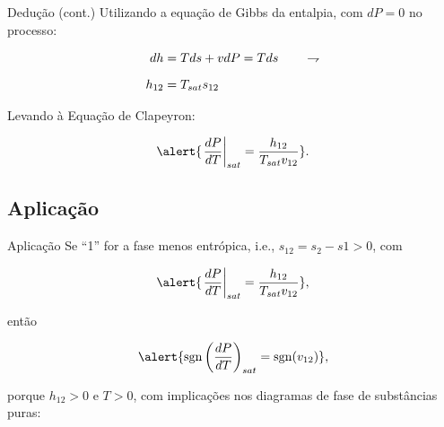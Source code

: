    \begin{frame}{Dedução (cont.)}\vspace*{-1em}
        Utilizando a equação de Gibbs da entalpia, com \alert{$dP=0$} no processo:

        \begin{align*}
            dh &= Tds + vdP = Tds
            \qquad\rightharpoondown\\[\medskipamount]
            h_{12} &= T_{sat}s_{12}
        \end{align*}

        Levando à \alert{Equação de Clapeyron}:

        \begin{equation*}
            \alert{
                \left.\frac{dP}{dT}\right|_{sat} =
                \frac{h_{12}}{T_{sat}v_{12}}
            }.
        \end{equation*}
    \end{frame}

\subsection{Aplicação}

    \begin{frame}{Aplicação}\vspace*{-1em}
        Se ``\alert{1}'' for a fase \alert{menos entrópica}, i.e., \alert{$s_{12} = s_2 - s1 >
        0$}, com

        \begin{equation*}
            \alert{
                \left.\frac{dP}{dT}\right|_{sat} =
                \frac{h_{12}}{T_{sat}v_{12}}
            },
        \end{equation*}

        então

        \begin{equation*}
            \alert{
                \operatorname{sgn}\left(\frac{dP}{dT}\right)_{sat} =
                \operatorname{sgn}(v_{12})
            },
        \end{equation*}\vspace*\medskipamount

        porque \alert{$h_{12} > 0$} e \alert{$T > 0$}, com implicações nos \alert{diagramas de
        fase} de substâncias puras:

    \end{frame}

